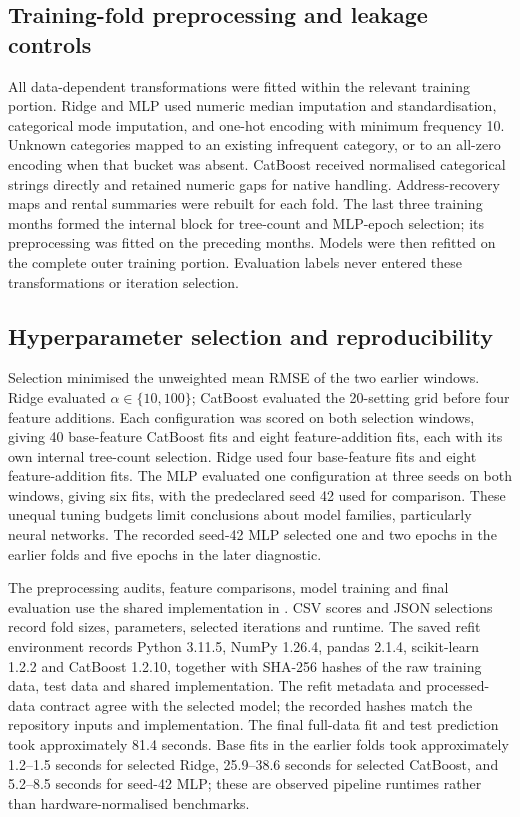\documentclass[conference]{IEEEtran}
\newcommand{\field}[1]{\texttt{\detokenize{#1}}}
\begin{document}
\subsection{Training-fold preprocessing and leakage controls}
All data-dependent transformations were fitted within the relevant training
portion. Ridge and MLP used numeric median imputation and standardisation,
categorical mode imputation, and one-hot encoding with minimum frequency 10.
Unknown categories mapped to an existing infrequent category, or to an
all-zero encoding when that bucket was absent. CatBoost received normalised
categorical strings directly and retained numeric gaps for native handling.
Address-recovery maps and rental summaries were rebuilt for each fold.
The last three training months formed the internal block for tree-count
and MLP-epoch selection; its preprocessing was fitted on the preceding
months. Models were then refitted on the complete outer training portion.
Evaluation labels never entered these transformations or iteration selection.

\subsection{Hyperparameter selection and reproducibility}
Selection minimised the unweighted mean RMSE of the two earlier windows.
Ridge evaluated $\alpha\in\{10,100\}$; CatBoost evaluated the 20-setting grid
before four feature additions. Each configuration was scored on both
selection windows, giving 40 base-feature CatBoost fits and eight
feature-addition fits, each with its own internal tree-count selection.
Ridge used four base-feature fits and eight feature-addition fits. The MLP
evaluated one configuration at three seeds on both windows, giving six
fits, with the predeclared seed 42 used for comparison. These unequal tuning
budgets limit conclusions about model families, particularly neural networks.
The recorded seed-42 MLP selected one and two epochs in the earlier folds
and five epochs in the later diagnostic.

The preprocessing audits, feature comparisons, model training and final
evaluation use the shared implementation in
\field{experiments/rental_experiments.py}. CSV scores and JSON selections
record fold sizes, parameters, selected iterations and runtime. The saved
refit environment records Python 3.11.5, NumPy 1.26.4, pandas 2.1.4,
scikit-learn 1.2.2 and CatBoost 1.2.10, together with SHA-256 hashes of the
raw training data, test data and shared implementation. The refit metadata and
processed-data contract agree with the selected model; the recorded hashes
match the repository inputs and implementation. The final full-data fit and
test prediction took approximately 81.4 seconds. Base fits in the earlier
folds took approximately 1.2--1.5 seconds for selected Ridge, 25.9--38.6
seconds for selected CatBoost, and 5.2--8.5 seconds for seed-42 MLP; these are
observed pipeline runtimes rather than hardware-normalised benchmarks.
\end{document}
